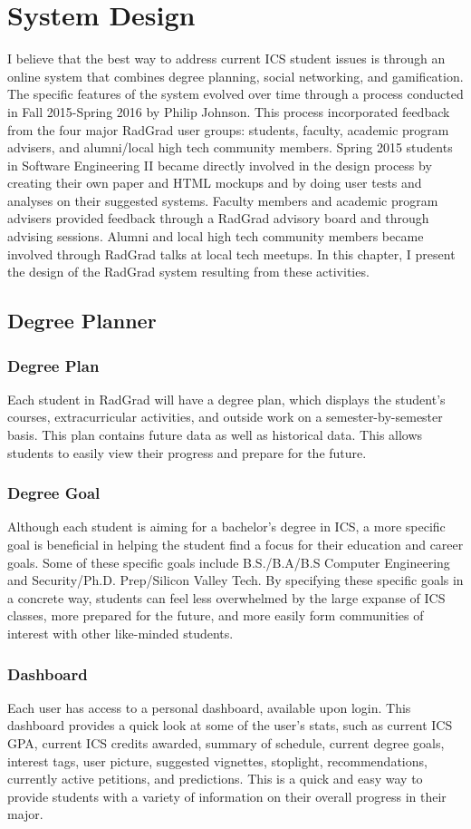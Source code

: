\chapter{System Design}
I believe that the best way to address current ICS student issues is through an online system that combines degree planning, social networking, and gamification. The specific features of the system evolved over time through a process conducted in Fall 2015-Spring 2016 by Philip Johnson. This process incorporated feedback from the four major RadGrad user groups: students, faculty, academic program advisers, and alumni/local high tech community members. Spring 2015 students in Software Engineering II became directly involved in the design process by creating their own paper and HTML mockups and by doing user tests and analyses on their suggested systems. Faculty members and academic program advisers provided feedback through a RadGrad advisory board and through advising sessions. Alumni and local high tech community members became involved through RadGrad talks at local tech meetups. In this chapter, I present the design of the RadGrad system resulting from these activities. 
\section{Degree Planner}
\subsection{Degree Plan}
Each student in RadGrad will have a degree plan, which displays the student's courses, extracurricular activities, and outside work on a semester-by-semester basis. This plan contains future data as well as historical data. This allows students to easily view their progress and prepare for the future. 
\subsection{Degree Goal}
Although each student is aiming for a bachelor's degree in ICS, a more specific goal is beneficial in helping the student find a focus for their education and career goals. Some of these specific goals include B.S./B.A/B.S Computer Engineering and Security/Ph.D. Prep/Silicon Valley Tech. By specifying these specific goals in a concrete way, students can feel less overwhelmed by the large expanse of ICS classes, more prepared for the future, and more easily form communities of interest with other like-minded students.
\subsection{Dashboard}
Each user has access to a personal dashboard, available upon login. This dashboard provides a quick look at some of the user's stats, such as current ICS GPA, current ICS credits awarded, summary of schedule, current degree goals, interest tags, user picture, suggested vignettes, stoplight, recommendations, currently active petitions, and predictions. This is a quick and easy way to provide students with a variety of information on their overall progress in their major. 

